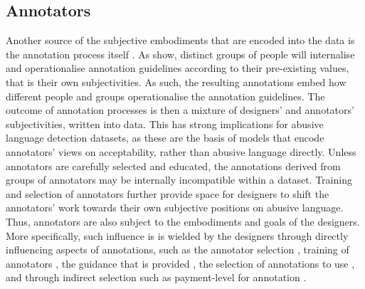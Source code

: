 {\subsection{Annotators}
Another source of the subjective embodiments that are encoded into the data is the annotation process itself \citep{Waseem:2016}.
As \citet{Waseem:2016} show, distinct groups of people will internalise and operationalise annotation guidelines according to their pre-existing values, that is their own subjectivities.
As such, the resulting annotations embed how different people and groups operationalise the annotation guidelines.
The outcome of annotation processes is then a mixture of designers' and annotators' subjectivities, written into data.
This has strong implications for abusive language detection datasets, as these are the basis of models that encode annotators' views on acceptability, rather than abusive language directly.
Unless annotators are carefully selected and educated, the annotations derived from groups of annotators may be internally incompatible within a dataset.
Training and selection of annotators further provide space for designers to shift the annotators' work towards their own subjective positions on abusive language.
Thus, annotators are also subject to the embodiments and goals of the designers.
More specifically, such influence is is wielded by the designers through directly influencing aspects of annotations, such as the annotator selection \citep{Waseem:2016}, training of annotators \citep{Vidgen:2020}, the guidance that is provided \citep{Palmer:2020}, the selection of annotations to use \citep{Hovy:2013}, and through indirect selection  such as payment-level for annotation \citep{Sabou:2014}.

}
